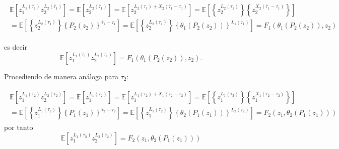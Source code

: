 \documentclass{article}
\newcommand{\esp}{\mathbb{E}}
\numberwithin{equation}{section}
\begin{document}
\begin{eqnarray*}
\begin{array}{l}
\esp\left[z_{1}^{L_{1}\left(\overline{\tau}_{1}\right)}z_{2}^{L_{2}\left(\overline{\tau}_{1}\right)}\right]=\esp\left[z_{2}^{L_{2}\left(\overline{\tau}_{1}\right)}\right]=\esp\left[z_{2}^{L_{2}\left(\tau_{1}\right)+X_{2}\left(\overline{\tau}_{1}-\tau_{1}\right)}\right]=\esp\left[\left\{z_{2}^{L_{2}\left(\tau_{1}\right)}\right\}\left\{z_{2}^{X_{2}\left(\overline{\tau}_{1}-\tau_{1}\right)}\right\}\right]\\
=\esp\left[\left\{z_{2}^{L_{2}\left(\tau_{1}\right)}\right\}\left\{P_{2}\left(z_{2}\right)\right\}^{\overline{\tau}_{1}-\tau_{1}}\right]=\esp\left[\left\{z_{2}^{L_{2}\left(\tau_{1}\right)}\right\}\left\{\theta_{1}\left(P_{2}\left(z_{2}\right)\right)\right\}^{L_{1}\left(\tau_{1}\right)}\right]=F_{1}\left(\theta_{1}\left(P_{2}\left(z_{2}\right)\right),z_{2}\right)
\end{array}
\end{eqnarray*}

es decir 
\begin{equation}\label{Eq.base.F1}
\esp\left[z_{1}^{L_{1}\left(\overline{\tau}_{1}\right)}z_{2}^{L_{2}\left(\overline{\tau}_{1}\right)}\right]=F_{1}\left(\theta_{1}\left(P_{2}\left(z_{2}\right)\right),z_{2}\right).
\end{equation}

Procediendo de manera an\'aloga para $\overline{\tau}_{2}$:

\begin{eqnarray*}
\begin{array}{l}
\esp\left[z_{1}^{L_{1}\left(\overline{\tau}_{2}\right)}z_{2}^{L_{2}\left(\overline{\tau}_{2}\right)}\right]=\esp\left[z_{1}^{L_{1}\left(\overline{\tau}_{2}\right)}\right]=\esp\left[z_{1}^{L_{1}\left(\tau_{2}\right)+X_{1}\left(\overline{\tau}_{2}-\tau_{2}\right)}\right]=\esp\left[\left\{z_{1}^{L_{1}\left(\tau_{2}\right)}\right\}\left\{z_{1}^{X_{1}\left(\overline{\tau}_{2}-\tau_{2}\right)}\right\}\right]\\
=\esp\left[\left\{z_{1}^{L_{1}\left(\tau_{2}\right)}\right\}\left\{P_{1}\left(z_{1}\right)\right\}^{\overline{\tau}_{2}-\tau_{2}}\right]=\esp\left[\left\{z_{1}^{L_{1}\left(\tau_{2}\right)}\right\}\left\{\theta_{2}\left(P_{1}\left(z_{1}\right)\right)\right\}^{L_{2}\left(\tau_{2}\right)}\right]=F_{2}\left(z_{1},\theta_{2}\left(P_{1}\left(z_{1}\right)\right)\right)
\end{array}
\end{eqnarray*}
por tanto
\begin{equation}\label{Eq.PGF.Conjunta.Tau2}
\esp\left[z_{1}^{L_{1}\left(\overline{\tau}_{2}\right)}z_{2}^{L_{2}\left(\overline{\tau}_{2}\right)}\right]=F_{2}\left(z_{1},\theta_{2}\left(P_{1}\left(z_{1}\right)\right)\right)
\end{equation}
\end{document}
